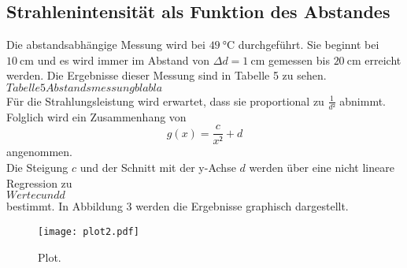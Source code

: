 \subsection{Strahlenintensität als Funktion des Abstandes}
Die abstandsabhängige Messung wird bei $\SI{49}{\celsius}$ durchgeführt.
Sie beginnt bei $\SI{10}{\cm}$ und es wird immer im Abstand von $\Delta d = \SI{1}{\cm}$ gemessen bis $\SI{20}{\cm}$ erreicht werden.
Die Ergebnisse dieser Messung sind in Tabelle 5 zu sehen.\\
$Tabelle 5 Abstandsmessung blabla$\\
Für die Strahlungsleistung wird erwartet, dass sie proportional zu $\frac{1}{d²}$ abnimmt.
Folglich wird ein Zusammenhang von
\begin{equation}
  g(x) = \frac{c}{x²} + d
\end{equation}
angenommen.\\
Die Steigung $c$ und der Schnitt mit der y-Achse $d$ werden über eine nicht lineare Regression zu
\\
$Werte c und d$
\\
bestimmt. In Abbildung 3 werden die Ergebnisse graphisch dargestellt.
\begin{figure}[H]
  \centering
  \texttt{[image: plot2.pdf]}
  \caption{Plot.}
  \label{fig:plot2}
\end{figure}
